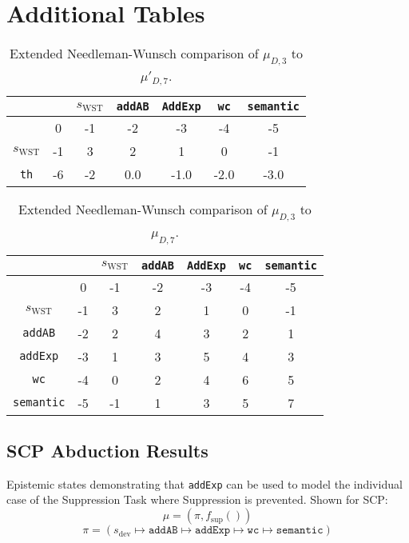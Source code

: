 \section*{Additional Tables}
\begin{table}[!htbp]
\begin{center}
\begin{tabular}{c | c c c c c c }
 & & $s_\text{WST}$ & \texttt{addAB} & \texttt{AddExp} & \texttt{wc} & \texttt{semantic}\\
\hline
 & 0 & -1 & -2 & -3 & -4 & -5\\
$s_\text{WST}$ & -1 & 3 & 2 & 1 & 0 & -1\\
\texttt{th} & -6 & -2 & 0.0 & -1.0 & -2.0 & -3.0
\end{tabular}
\caption{Extended Needleman-Wunsch comparison of $\mu_{D,3}$ to $\mu'_{D,7}$.}
\label{tbl:extal1}
\end{center}
\end{table}








\begin{table}[h!]
\begin{center}
\begin{tabular}{c | c c c c c c }
 & & $s_\text{WST}$ & \texttt{addAB} & \texttt{AddExp} & \texttt{wc} & \texttt{semantic}\\
\hline
 & 0 & -1 & -2 & -3 & -4 & -5\\
$s_\text{WST}$ & -1 & 3 & 2 & 1 & 0 & -1\\
\texttt{addAB} & -2 & 2 & 4 & 3 & 2 & 1\\
\texttt{addExp} & -3 & 1 & 3 & 5 & 4 & 3\\
\texttt{wc} & -4 & 0 & 2 & 4 & 6 & 5\\
\texttt{semantic} & -5 & -1 & 1 & 3 & 5 & 7
\end{tabular}
\caption{Extended Needleman-Wunsch comparison of $\mu_{D,3}$ to $\mu_{D,7}$.}
\label{tbl:extal2}
\end{center}
\end{table}

\newpage






\subsection*{SCP Abduction Results}\label{ssec:scpabres}
Epistemic states demonstrating that \texttt{addExp} can be used to model the individual case of the Suppression Task where Suppression is prevented. Shown for SCP:
\[\mu=(\pi,f_\text{sup}())\]
\[\pi = (s_\text{dev} \longmapsto \texttt{addAB} \longmapsto \texttt{addExp} \longmapsto \texttt{wc} \longmapsto \texttt{semantic} )\]

